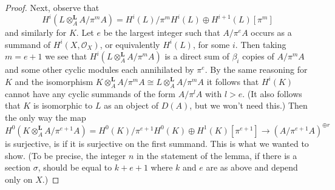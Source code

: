 \begin{proof}
Next, observe that
$$
H^i(L \otimes_A^\mathbf{L} A/\pi^m A) =
H^i(L)/\pi^m H^i(L) \oplus H^{i + 1}(L)[\pi^m]
$$
and similarly for $K$. Let $e$ be the largest integer
such that $A/\pi^eA$ occurs as a summand of $H^i(X, \mathcal{O}_X)$,
or equivalently $H^i(L)$, for some $i$. Then taking $m = e + 1$
we see that $H^i(L \otimes_A^\mathbf{L} A/\pi^m A)$ is a direct sum of
$\beta_i$ copies of $A/\pi^m A$ and some other cyclic modules
each annihilated by $\pi^e$. By the same reasoning for $K$
and the isomorphism
$K \otimes_A^\mathbf{L} A/\pi^m A \cong L \otimes_A^\mathbf{L} A/\pi^m A$
it follows that $H^i(K)$
cannot have any cyclic summands of the form $A/\pi^l A$
with $l > e$. (It also follows that $K$ is isomorphic to $L$
as an object of $D(A)$, but we won't need this.)
Then the only way the map
$$
H^0(K \otimes^\mathbf{L}_A A/\pi^{e + 1} A) =
H^0(K)/\pi^{e + 1}H^0(K) \oplus H^1(K)[\pi^{e + 1}]
\longrightarrow
(A/\pi^{e + 1} A)^{\oplus r}
$$
is surjective, is if it is surjective on the
first summand. This is what we wanted to show.
(To be precise, the integer $n$ in the statement of
the lemma, if there is a section $\sigma$,
should be equal to $k + e + 1$ where $k$ and $e$ are as above
and depend only on $X$.)
\end{proof}
